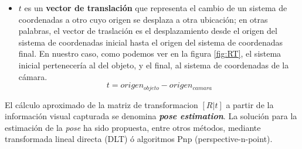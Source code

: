 \begin{itemize}
\item $t$ es un \textbf{vector de translación} que representa el cambio de un sistema de coordenadas a otro cuyo origen se desplaza a otra ubicación; en otras palabras, el vector de traslación es el desplazamiento desde el origen del sistema de coordenadas inicial hasta el origen del sistema de coordenadas final. En nuestro caso, como podemos ver en la figura \ref{fig:RT}, el sistema inicial pertenecería al del objeto, y el final, al sistema de coordenadas de la cámara. 
\begin{equation}
t = origen_{objeto} - origen_{camara}
\end{equation}


\end{itemize}

El cálculo aproximado de la matriz de transformacion $[R|t]$ a partir de la información visual capturada se denomina \textbf{\textit{pose estimation}}. La solución para la estimación de la \textit{pose} ha sido propuesta, entre otros métodos, mediante transformada lineal directa (DLT) ó algoritmos Pnp (perspective-n-point).





